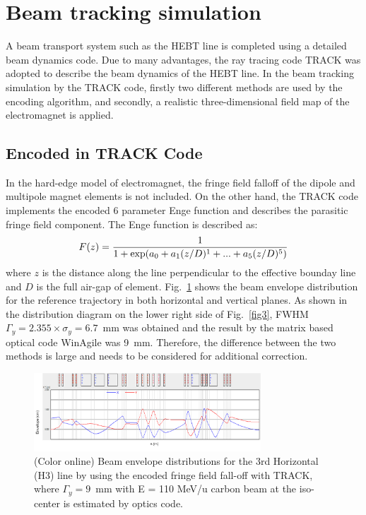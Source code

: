 \documentclass[jkps,preprint,fleqn,showpacs,showkeys]{revtex4}
\begin{document}
\section{Beam tracking simulation}
\label{sec:TRACK}
A beam transport system such as the HEBT line is completed using a detailed beam dynamics code.
Due to many advantages, the ray tracing code TRACK\cite{TRACK} was adopted to describe the beam dynamics of the HEBT line.
In the beam tracking simulation by the TRACK code, firstly two different methods are used by the encoding algorithm,
and secondly, a realistic three-dimensional field map of the electromagnet is applied.

\subsection{Encoded in TRACK Code}
In the hard-edge model of electromagnet, the fringe field falloff of the dipole and multipole magnet elements is not included.
On the other hand, the TRACK code implements the encoded 6 parameter Enge function\cite{Enge} and describes the parasitic fringe field component.  
The Enge function is described as\cite{EngeTrack}:
\[
F(z) = \frac{1}{1+{\rm exp}(a_{0}+a_{1}(z/D)^{1}+...+a_{5}(z/D)^{5})} 
\]
where $z$ is the distance along the line perpendicular to the effective bounday line and $D$ is the full air-gap of element.
Fig.~\ref{fig2} shows the beam envelope distribution for the reference trajectory in both horizontal and vertical planes.
As shown in the distribution diagram on the lower right side of Fig.~\ref{fig3}, FWHM $\Gamma_{y} = 2.355 \times \sigma_{y} = 6.7$~mm was obtained
and the result by the matrix based optical code WinAgile was 9~mm.
Therefore, the difference between the two methods is large and needs to be considered for additional correction.
\begin{figure}[h]
  \begin{center}
    \includegraphics[width=8.5cm]{Fig03.png}      
    \caption{(Color online) Beam envelope distributions for the 3rd Horizontal (H3) line by using the encoded fringe field fall-off with TRACK, 
      where $\Gamma_{y} = 9$~mm with E = 110 MeV/u carbon beam at the iso-center is estimated by optics code.}
    \label{fig2}
  \end{center}
\end{figure}
\end{document}
